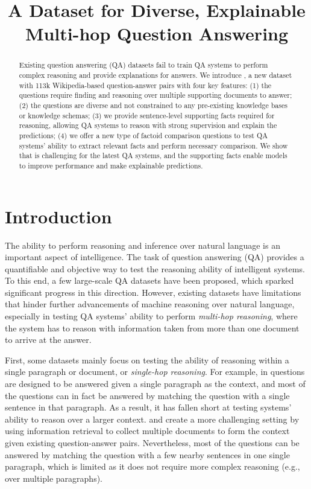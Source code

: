 \title{A Dataset for Diverse, Explainable Multi-hop Question Answering}

\begin{abstract}
Existing question answering (QA) datasets fail to train QA systems to perform complex reasoning and provide explanations for answers. We introduce \datasetname
, a new dataset with 113k Wikipedia-based question-answer pairs with four key features: (1) the questions require finding and reasoning over multiple supporting documents to answer; (2) the questions are diverse and not constrained to any pre-existing knowledge bases or knowledge schemas; (3) we provide sentence-level supporting facts required for reasoning, allowing QA systems to reason with strong supervision and explain the predictions; (4) we offer a new type of factoid comparison questions to test QA systems' ability to extract relevant facts and perform necessary comparison. We show that \datasetname{} is challenging for the latest QA systems, and the supporting facts enable models to improve performance and make explainable predictions.
\end{abstract}

\section{Introduction}

The ability to perform reasoning and inference over natural language is an important aspect of intelligence. The task of question answering (QA) provides a quantifiable and objective way to test the reasoning ability of intelligent systems. To this end, a few large-scale QA datasets have been proposed, which sparked significant progress in this direction. However, existing datasets have limitations that hinder further advancements of machine reasoning over natural language, especially in testing QA systems' ability to perform \emph{multi-hop reasoning}, where the system has to reason with information taken from more than one document to arrive at the answer.

First, some datasets mainly focus on testing the ability of reasoning within a single paragraph or document, or \emph{single-hop reasoning}. For example, in \squad{} \cite{rajpurkar2016squad} questions are designed to be answered given a single paragraph as the context, and most of the questions can in fact be answered by matching the question with a single sentence in that paragraph. As a result, it has fallen short at testing systems' ability to reason over a larger context.
\triviaqa{} \cite{Joshi2017TriviaQA} and \searchqa{} \cite{dunn2017searchqa} create a more challenging setting by using information retrieval to collect multiple documents to form the context given existing question-answer pairs. Nevertheless, most of the questions can be answered by matching the question with a few nearby sentences in one single paragraph, which is limited as it does not require more complex reasoning (e.g., over multiple paragraphs).

